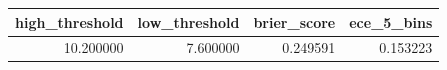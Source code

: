 \begin{tabular}{rrrr}
\toprule
high\_threshold & low\_threshold & brier\_score & ece\_5\_bins \\
\midrule
10.200000 & 7.600000 & 0.249591 & 0.153223 \\
\bottomrule
\end{tabular}
